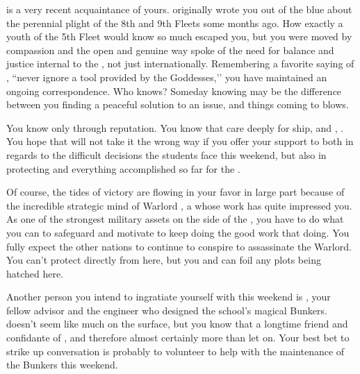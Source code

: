 \documentclass[char]{GL2020}
\begin{document}
\cPirateChild{\intro} is a very recent acquaintance of yours. \cPirateChild{\They} originally wrote you out of the blue about the perennial plight of the 8th and 9th Fleets some months ago. How exactly a youth of the 5th Fleet would know so much escaped you, but you were moved by \cPirateChild{\their} compassion and the open and genuine way \cPirateChild{\they} spoke of the need for balance and justice internal to the \pShip{}, not just internationally. Remembering a favorite saying of \cHeadDiplomat{}, ``never ignore a tool provided by the Goddesses,’’ you have maintained an ongoing correspondence. Who knows? Someday knowing \cPirateChild{} may be the difference between you finding a peaceful solution to an issue, and things coming to blows.

You know \cWarlordDaughter{\intro} only through reputation. You know that \cWarlordDaughter{\they} care\cWarlordDaughter{\verbs} deeply for \cWarlordDaughter{\their} ship, and \cWarlordDaughter{\their} \cLoud{\parent}, \cLoud{\intro}. You hope that \cWarlordDaughter{} will not take it the wrong way if you offer your support to \cWarlordDaughter{\them} both in regards to the difficult decisions the students face this weekend, but also in protecting \cLoud{} and everything \cLoud{\theyhave} accomplished so far for the \pShip{}.

Of course, the tides of victory are flowing in your favor in large part because of the incredible strategic mind of Warlord \cLoud{\full}, a \cLoud{\person} whose work has quite impressed you. As one of the strongest military assets on the side of the \pShip{}, you have to do what you can to safeguard and motivate \cLoud{} to keep doing the good work that \cLoud{\theyare} doing. You fully expect the other nations to continue to conspire to assassinate the Warlord. You can't protect \cLoud{} directly from here, but you and \cWarlordDaughter{} can foil any plots being hatched here.

Another person you intend to ingratiate yourself with this weekend is \cBunker{\full}, your fellow advisor and the engineer who designed the school's magical Bunkers. \cBunker{} doesn't seem like much on the surface, but you know that \cBunker{\theyare} a longtime friend and confidante of \cHeadDiplomat{}, and therefore almost certainly more than \cBunker{\they} let\cBunker{\verbs} on. Your best bet to strike up conversation is probably to volunteer to help \cBunker{} with the maintenance of the Bunkers this weekend.
\end{document}
